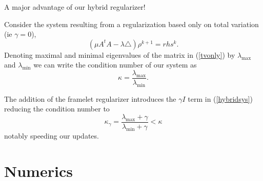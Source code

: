 \documentclass[xcolor=dvipsnames]{beamer}
\newcommand*{\sectionpage}{\usebeamertemplate*{section page}}
\theoremstyle{remark}
\begin{document}
\begin{frame}

A major advantage of our hybrid regularizer!

Consider the system resulting from a regularization based only on total variation (ie $\gamma =0$),
\begin{equation}\label{tvonly}
(\mu A^tA - \lambda \triangle)\rho^{k+1} = rhs^k.
\end{equation}
Denoting maximal and minimal eigenvalues of the matrix in (\ref{tvonly}) by $\lambda_{\max}$ and $\lambda_{\min}$ we can write the condition number of our system as
\begin{equation}
\kappa = \frac{\lambda_{\max}}{\lambda_{\min}}.
\end{equation}

The addition of the framelet regularizer introduces the $\gamma I$ term in (\ref{hybridsys}) reducing the condition number to
\begin{equation}
\kappa_\gamma  =  \frac{\lambda_{\max} + \gamma}{\lambda_{\min} + \gamma} < \kappa
\end{equation}
notably speeding our updates.

\end{frame}

\section{Numerics}
\frame{\sectionpage}

\end{document}
